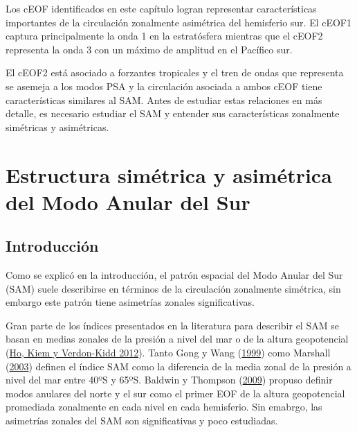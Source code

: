 \documentclass[12pt,oneside,a4paper]{reedthesis}
\begin{document}
Los cEOF identificados en este capítulo logran representar características importantes de la circulación zonalmente asimétrica del hemisferio sur.
El cEOF1 captura principalmente la onda 1 en la estratósfera mientras que el cEOF2 representa la onda 3 con un máximo de amplitud en el Pacífico sur.

El cEOF2 está asociado a forzantes tropicales y el tren de ondas que representa se asemeja a los modos PSA y la circulación asociada a ambos cEOF tiene características similares al SAM.
Antes de estudiar estas relaciones en más detalle, es necesario estudiar el SAM y entender sus características zonalmente simétricas y asimétricas.

\hypertarget{asymsam}{%
\chapter{Estructura simétrica y asimétrica del Modo Anular del Sur}\label{asymsam}}

\hypertarget{introducciuxf3n-1}{%
\section{Introducción}\label{introducciuxf3n-1}}

Como se explicó en la introducción, el patrón espacial del Modo Anular del Sur (SAM) suele describirse en términos de la circulación zonalmente simétrica, sin embargo este patrón tiene asimetrías zonales significativas.

Gran parte de los índices presentados en la literatura para describir el SAM se basan en medias zonales de la presión a nivel del mar o de la altura geopotencial (\protect\hyperlink{ref-ho2012}{Ho, Kiem y Verdon-Kidd 2012}).
Tanto Gong y Wang (\protect\hyperlink{ref-gong1999}{1999}) como Marshall (\protect\hyperlink{ref-marshall2003}{2003}) definen el índice SAM como la diferencia de la media zonal de la presión a nivel del mar entre 40ºS y 65ºS.
Baldwin y Thompson (\protect\hyperlink{ref-baldwin2009}{2009}) propuso definir modos anulares del norte y el sur como el primer EOF de la altura geopotencial promediada zonalmente en cada nivel en cada hemisferio.
Sin emabrgo, las asimetrías zonales del SAM son significativas y poco estudiadas.
\end{document}
